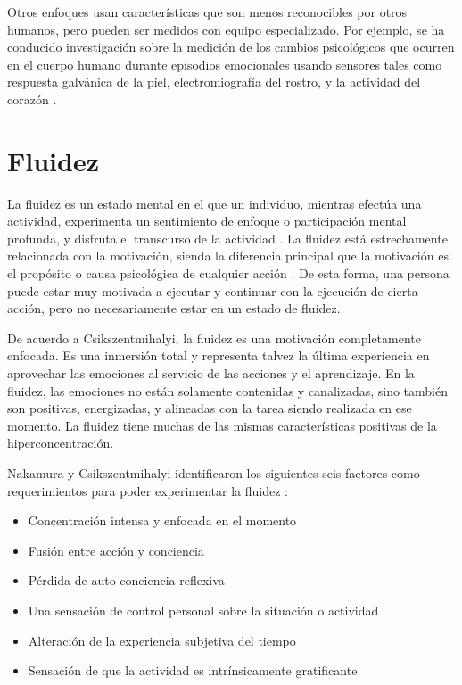Otros enfoques usan características que son menos reconocibles por otros humanos, pero pueden ser medidos con equipo especializado. Por ejemplo, se ha conducido investigación sobre la medición de los cambios psicológicos que ocurren en el cuerpo humano durante episodios emocionales usando sensores tales como respuesta galvánica de la piel, electromiografía del rostro, y la actividad del corazón \cite{fairclough2009fundamentals}.

\section{Fluidez}

La fluidez es un estado mental en el que un individuo, mientras efectúa una actividad, experimenta un sentimiento de enfoque o participación mental profunda, y disfruta el transcurso de la actividad \cite{csikszentmihalyi1991flow}. La fluidez está estrechamente relacionada con la motivación, sienda la diferencia principal que la motivación es el propósito o causa psicológica de cualquier acción \cite{schacter2010psychology}. De esta forma, una persona puede estar muy motivada a ejecutar y continuar con la ejecución de cierta acción, pero no necesariamente estar en un estado de fluidez.

De acuerdo a Csikszentmihalyi, la fluidez es una motivación completamente enfocada. Es una inmersión total y representa talvez la última experiencia en aprovechar las emociones al servicio de las acciones y el aprendizaje. En la fluidez, las emociones no están solamente contenidas y canalizadas, sino también son positivas, energizadas, y alineadas con la tarea siendo realizada en ese momento. La fluidez tiene muchas de las mismas características positivas de la hiperconcentración.

Nakamura y Csikszentmihalyi identificaron los siguientes seis factores como requerimientos para poder experimentar la fluidez \cite{nakamura200918}:

\begin{itemize}
  \item Concentración intensa y enfocada en el momento
  \item Fusión entre acción y conciencia
  \item Pérdida de auto-conciencia reflexiva
  \item Una sensación de control personal sobre la situación o actividad
  \item Alteración de la experiencia subjetiva del tiempo
  \item Sensación de que la actividad es intrínsicamente gratificante
\end{itemize}

